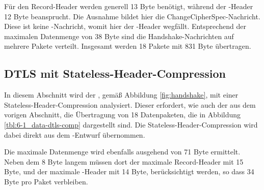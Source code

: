 Für den Record-Header werden generell 13 Byte benötigt, während der -Header 12 Byte beansprucht. Die Ausnahme bildet hier die ChangeCipherSpec-Nachricht.
Diese ist keine -Nachricht, womit hier der -Header wegfällt. Entsprechend der maximalen Datenmenge von 38 Byte sind die Handshake-Nachrichten
auf mehrere Pakete verteilt. Insgesamt werden 18 Pakete mit 831 Byte übertragen.

\subsection{DTLS mit Stateless-Header-Compression}

In diesem Abschnitt wird der , gemäß Abbildung \ref{fig:handshake}, mit einer Stateless-Header-Compression analysiert. Dieser erfordert,
wie auch der  aus dem vorigen Abschnitt, die Übertragung von 18 Datenpaketen, die in Abbildung \ref{tbl:6-1_data-dtls-comp} dargestellt sind.
Die Stateless-Header-Compression wird dabei direkt aus dem -Entwurf \cite[Kapitel 3]{draftcodtls} übernommen.

Die maximale Datenmenge wird ebenfalls ausgehend von 71 Byte ermittelt. Neben dem 8 Byte langem  müssen dort der maximale Record-Header mit 15 Byte, und
der maximale -Header mit 14 Byte, berücksichtigt werden, so dass 34 Byte pro Paket verbleiben.

